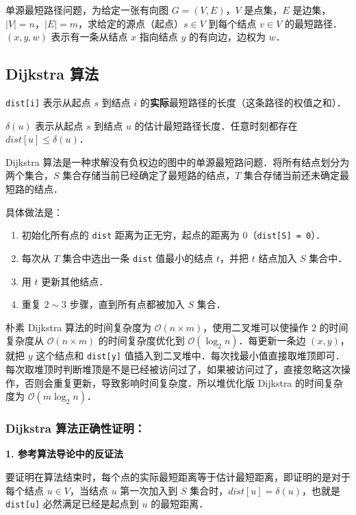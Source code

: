 

单源最短路径问题，为给定一张有向图 $G = (V, E)$，$V$ 是点集，$E$ 是边集，$|V|= n$，$|E| = m$，求给定的源点（起点）$s \in V$ 到每个结点 $v \in V$ 的最短路径．$(x, y, w)$ 表示有一条从结点 $x$ 指向结点 $y$ 的有向边，边权为 $w$．

\subsection{Dijkstra 算法}

\verb|dist[i]| 表示从起点 $s$ 到结点 $i$ 的\textbf{实际}最短路径的长度（这条路径的权值之和）．

$\delta(u)$ 表示从起点 $s$ 到结点 $u$ 的估计最短路径长度．任意时刻都存在 $dist[u] \leq \delta(u)$．
   
Dijkstra 算法是一种求解没有负权边的图中的单源最短路问题．将所有结点划分为两个集合，$S$ 集合存储当前已经确定了最短路的结点，$T$ 集合存储当前还未确定最短路的结点．

具体做法是：
\begin{enumerate}
\item 初始化所有点的 \verb|dist| 距离为正无穷，起点的距离为 $0$（\verb|dist[S] = 0|）．
\item 每次从 $T$ 集合中选出一条 \verb|dist| 值最小的结点 $t$，并把 $t$ 结点加入 $S$ 集合中．
\item 用 $t$ 更新其他结点．
\item 重复 $2 \sim 3$ 步骤，直到所有点都被加入 $S$ 集合．
\end{enumerate}

朴素 Dijkstra 算法的时间复杂度为 $\mathcal{O}(n \times m)$，使用二叉堆可以使操作 $2$ 的时间复杂度从 $\mathcal{O}(n \times m)$ 的时间复杂度优化到 $\mathcal{O}(\log_2 n)$．每更新一条边 $(x, y)$，就把 $y$ 这个结点和 \verb|dist[y]| 值插入到二叉堆中．每次找最小值直接取堆顶即可．每次取堆顶时判断堆顶是不是已经被访问过了，如果被访问过了，直接忽略这次操作，否则会重复更新，导致影响时间复杂度．所以堆优化版 Dijkstra 的时间复杂度为 $\mathcal{O}(m \log_2 n)$．

\subsubsection{Dijkstra 算法正确性证明：}

\textbf{1. 参考算法导论中的反证法}

要证明在算法结束时，每个点的实际最短距离等于估计最短距离，即证明的是对于每个结点 $u \in V$，当结点 $u$ 第一次加入到 $S$ 集合时，$dist[u] =\delta(u)$，也就是 \verb|dist[u]| 必然满足已经是起点到 $u$ 的最短距离．

